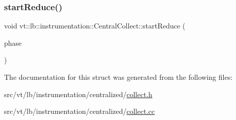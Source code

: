 \mbox{\label{structvt_1_1lb_1_1instrumentation_1_1_central_collect_a1b5d16c13976ea4c6db0275ef3ff35d8}} 
\subsubsection{\texorpdfstring{start\+Reduce()}{startReduce()}}
{\footnotesize\ttfamily void vt\+::lb\+::instrumentation\+::\+Central\+Collect\+::start\+Reduce (\begin{DoxyParamCaption}\item[{\hyperlink{namespacevt_a5505d0bab25ce2ff566a8e015871b379}{L\+B\+Phase\+Type} const \&}]{phase }\end{DoxyParamCaption})\hspace{0.3cm}{\ttfamily [static]}}



The documentation for this struct was generated from the following files\+:\begin{DoxyCompactItemize}
\item 
src/vt/lb/instrumentation/centralized/\hyperlink{collect_8h}{collect.\+h}\item 
src/vt/lb/instrumentation/centralized/\hyperlink{collect_8cc}{collect.\+cc}\end{DoxyCompactItemize}
